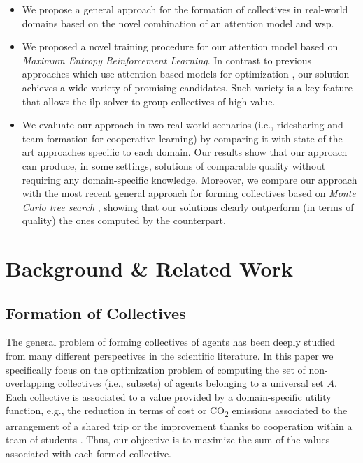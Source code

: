\documentclass{article}
\theoremstyle{definition}
\begin{document}
\begin{itemize}
    \item We propose a general approach for the formation of collectives in real-world domains based on the novel combination of an attention model and \gls{wsp}.
    \item We proposed a novel training procedure for our attention model based on \emph{Maximum Entropy Reinforcement Learning}. In contrast to previous approaches which use attention based models for optimization \cite{kool2018attention}, our solution achieves a wide variety of promising candidates. Such variety is a key feature that allows the \gls{ilp} solver to group collectives of high value.
    \item We evaluate our approach in two real-world scenarios (i.e., ridesharing and team formation for cooperative learning) by comparing it with state-of-the-art approaches specific to each domain. Our results show that our approach can produce, in some settings, solutions of comparable quality without requiring any domain-specific knowledge. Moreover, we compare our approach with the most recent general approach for forming collectives based on \emph{Monte Carlo tree search} \cite{wu2020monte}, showing that our solutions clearly outperform (in terms of quality) the ones computed by the counterpart.
\end{itemize}

\section{Background \& Related Work}


\subsection{Formation of Collectives}\label{sec:backcf}

The general problem of forming collectives of agents has been deeply studied from many different perspectives in the scientific literature.
In this paper we specifically focus on the optimization problem \cite{cerquides2014tutorial} of computing the set of non-overlapping collectives (i.e., subsets) of agents belonging to a universal set $A$.
Each collective is associated to a value provided by a domain-specific utility function, e.g., the reduction in terms of cost or CO\textsubscript{2} emissions associated to the arrangement of a shared trip \cite{bistaffa2019computational} or the improvement thanks to cooperation within a team of students \cite{andrejczuk2019synergistic}.
Thus, our objective is to maximize the sum of the values associated with each formed collective.
\end{document}
